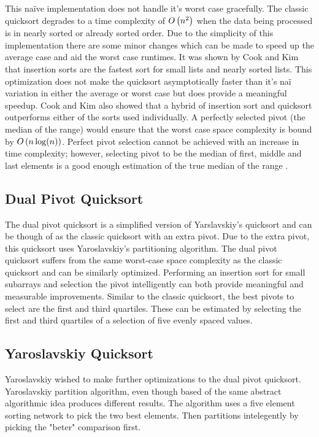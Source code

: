         This na\"{i}ve implementation does not handle it's worst case gracefully. The classic quicksort degrades to a time complexity of $O\left(n^2\right)$ when the data being processed is in nearly sorted or already sorted order. Due to the simplicity of this implementation there are some minor changes which can be made to speed up the average case and aid the worst case runtimes. It was shown by Cook and Kim \cite{cook1980best} that insertion sorts are the fastest sort for small lists and nearly sorted lists. This optimization does not make the quicksort asymptotically faster than it's na\"{i} variation in either the average or worst case but does provide a meaningful speedup. Cook and Kim also showed that a hybrid of insertion sort and quicksort outperforms either of the sorts used individually. A perfectly selected pivot (the median of the range) would ensure that the worst case space complexity is bound by $O\left(n\log(n)\right)$. Perfect pivot selection cannot be achieved with an increase in time complexity; however, selecting pivot to be the median of first, middle and last elements is a good enough estimation of the true median of the range \cite{sedgewick1978implementing}.


	\subsection{Dual Pivot Quicksort}
		\label{subsec:DualPivotQSortIntro}
        The dual pivot quicksort is a simplified version of Yarslavskiy's quicksort and can be though of as the classic quicksort with an extra pivot. Due to the extra pivot, this quicksort uses Yaroslavskiy's partitioning algorithm. The dual pivot quicksort suffers from the same worst-case space complexity as the classic quicksort and can be similarly optimized. Performing an insertion sort for small subarrays and selection the pivot intelligently can both provide meaningful and measurable improvements. Similar to the classic quicksort, the best pivots to select are the first and third quartiles. These can be estimated by selecting the first and third quartiles of a selection of five evenly spaced values.
	
	\subsection{Yaroslavskiy Quicksort}    
        \label{subsec:YaroslavskiyQSortIntro}
		Yaroslavskiy wished to make further optimizations to the dual pivot quicksort. Yaroslavskiy partition algorithm, even though based of the same abstract algorithmic idea produces different results\cite{Wild:2012:ACA:2404160.2404231}. The algorithm uses a five element sorting network to pick the two best elements. Then partitions intelegently by picking the "beter" comparison first\cite{Wild:2012:ACA:2404160.2404231}.
		
